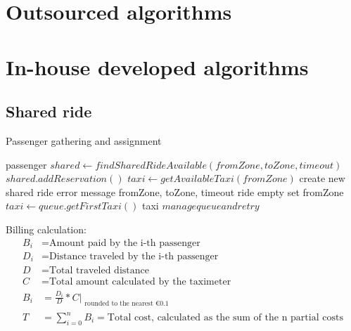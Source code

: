 \section{Outsourced algorithms}

\section{In-house developed algorithms}
\subsection{Shared ride}
Passenger gathering and assignment
\begin{algorithmic}
  {passenger}
  \State $ shared \gets findSharedRideAvailable(fromZone, toZone, timeout) $
    \State $ shared.addReservation() $
  \Else
    \State $ taxi \gets getAvailableTaxi(fromZone) $
      \State create new shared ride
    \Else
      \State error message
    \EndIf
  \EndIf
 \EndFunction
  {fromZone, toZone, timeout}
	    \Return ride
	  \EndIf
	\EndIf
      \EndIf
    \EndIf
  \EndFor
  \Return empty set
 \EndFunction
{} {fromZone}
       \State $ taxi \gets queue.getFirstTaxi() $
         \Return taxi
     \Else 
         \State $ manage queue and retry $
    \EndIf
\EndIf
\EndFor
\EndFunction


\end{algorithmic}

Billing calculation:
\begin{align*}
 B_{i} &= \text{Amount paid by the i-th passenger} \\
 D_{i} &= \text{Distance traveled by the i-th passenger} \\
 D &= \text{Total traveled distance} \\
 C &= \text{Total amount calculated by the taximeter} \\
 B_{i} &= \frac{D_{i}}{D} * C |_{\substack{\text{rounded to the nearest €0.1 }}} \\
 T &= \sum_{i=0}^{n} B_{i} = \text{Total cost, calculated as the sum of the n partial costs}
\end{align*}





